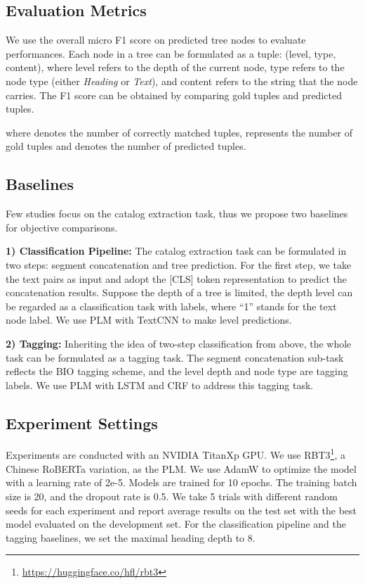 \documentclass[runningheads]{llncs}
\begin{document}
\subsection{Evaluation Metrics}\label{sec:exp_metrics}

We use the overall micro F1 score on predicted tree nodes to evaluate performances.
Each node in a tree can be formulated as a tuple: (level, type, content), where level refers to the depth of the current node, type refers to the node type (either \textit{Heading} or \textit{Text}), and content refers to the string that the node carries.
The F1 score can be obtained by comparing gold tuples and predicted tuples.


where  denotes the number of correctly matched tuples,  represents the number of gold tuples and  denotes the number of predicted tuples.

\subsection{Baselines}

Few studies focus on the catalog extraction task, thus we propose two baselines for objective comparisons.

\textbf{1) Classification Pipeline:} 
The catalog extraction task can be formulated in two steps: segment concatenation and tree prediction.
For the first step, we take the text pairs as input and adopt the [CLS] token representation to predict the concatenation results.
Suppose the depth of a tree is limited, the depth level can be regarded as a classification task with  labels, where ``1'' stands for the text node label.
We use PLM with TextCNN \cite{textcnn} to make level predictions.

\textbf{2) Tagging:}
Inheriting the idea of two-step classification from above, the whole task can be formulated as a tagging task.
The segment concatenation sub-task reflects the BIO tagging scheme, and the level depth and node type are tagging labels.
We use PLM with LSTM and CRF to address this tagging task.

\subsection{Experiment Settings}

Experiments are conducted with an NVIDIA TitanXp GPU.
We use RBT3\footnote{\url{https://huggingface.co/hfl/rbt3}}, a Chinese RoBERTa variation, as the PLM.
We use AdamW \cite{adamw} to optimize the model with a learning rate of 2e-5.
Models are trained for 10 epochs.
The training batch size is 20, and the dropout rate is 0.5.
We take 5 trials with different random seeds for each experiment and report average results on the test set with the best model evaluated on the development set.
For the classification pipeline and the tagging baselines, we set the maximal heading depth to 8.
\end{document}
